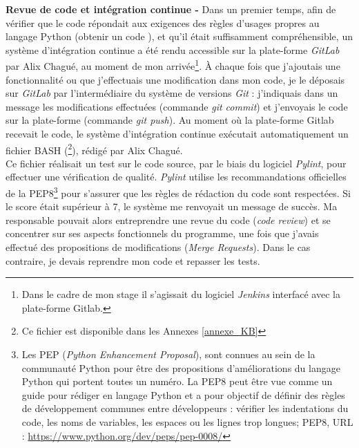 \textbf{Revue de code et intégration continue - }Dans un premier temps, afin de vérifier que le code répondait aux exigences des règles d'usages propres au langage Python (obtenir un code ), et qu'il était suffisamment compréhensible, un système d'intégration continue a été rendu accessible sur la plate-forme \textit{GitLab} par Alix Chagué, au moment de mon arrivée\footnote{Dans le cadre de mon stage il s'agissait du logiciel \textit{Jenkins} interfacé avec la plate-forme Gitlab.}. À chaque fois que j'ajoutais une fonctionnalité ou que j'effectuais une modification dans mon code, je le déposais sur \textit{GitLab} par l'intermédiaire du système de versions \textit{Git} : j'indiquais dans un message les modifications effectuées (commande \textit{git commit}) et j'envoyais le code sur la plate-forme (commande \textit{git push}). Au moment où la plate-forme Gitlab recevait le code, le système d'intégration continue exécutait automatiquement un fichier BASH (\footnote{Ce fichier est disponible dans les Annexes \ref{annexe_KB}}), rédigé par Alix Chagué. \\

Ce fichier réalisait un test sur le code source, par le biais du logiciel \textit{Pylint}, pour effectuer une vérification de qualité. \textit{Pylint} utilise les recommandations officielles de la PEP8\footnote{Les PEP (\textit{Python Enhancement Proposal}), sont connues au sein de la communauté Python pour être des propositions d'améliorations du langage Python qui portent toutes un numéro. La PEP8 peut être vue comme un guide pour rédiger en langage Python et a pour objectif de définir des règles de développement communes entre développeurs : vérifier les indentations du code, les noms de variables, les espaces ou les lignes trop longues; PEP8, URL : \url{https://www.python.org/dev/peps/pep-0008/}} pour s'assurer que les règles de rédaction du code sont respectées. Si le score était supérieur à 7, le système me renvoyait un message de succès. Ma responsable pouvait alors entreprendre une revue  du code (\textit{code review}) et se concentrer sur ses aspects fonctionnels du programme, une fois que j'avais effectué des propositions de modifications (\textit{Merge Requests}). Dans le cas contraire, je devais reprendre mon code et repasser les tests. \\

